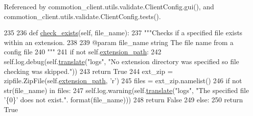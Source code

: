 Referenced by commotion\-\_\-client.\-utils.\-validate.\-Client\-Config.\-gui(), and commotion\-\_\-client.\-utils.\-validate.\-Client\-Config.\-tests().


\begin{DoxyCode}
235 
236     \textcolor{keyword}{def }\hyperlink{classcommotion__client_1_1utils_1_1validate_1_1ClientConfig_a8dbef5da5fb270a8842b3eed36bc595e}{check\_exists}(self, file\_name):
237         \textcolor{stringliteral}{"""Checks if a specified file exists within an extension.}
238 \textcolor{stringliteral}{}
239 \textcolor{stringliteral}{        @param file\_name string The file name from a config file}
240 \textcolor{stringliteral}{        """}
241         \textcolor{keywordflow}{if} \textcolor{keywordflow}{not} self.\hyperlink{classcommotion__client_1_1utils_1_1validate_1_1ClientConfig_a422e4fea49a7e582749c0e0c6d11e2d9}{extension\_path}:
242             self.log.debug(self.\hyperlink{classcommotion__client_1_1utils_1_1validate_1_1ClientConfig_a12d19377a853ce92cc0e0d758acdd804}{translate}(\textcolor{stringliteral}{"logs"}, \textcolor{stringliteral}{"No extension directory was specified so file
       checking was skipped."}))
243             \textcolor{keywordflow}{return} \textcolor{keyword}{True}
244         ext\_zip = zipfile.ZipFile(self.\hyperlink{classcommotion__client_1_1utils_1_1validate_1_1ClientConfig_a422e4fea49a7e582749c0e0c6d11e2d9}{extension\_path}, \textcolor{stringliteral}{'}\textcolor{stringliteral}{r')}
245 \textcolor{stringliteral}{        files = ext\_zip.namelist()}
246 \textcolor{stringliteral}{        }\textcolor{keywordflow}{if} \textcolor{keywordflow}{not} str(file\_name) \textcolor{keywordflow}{in} files:
247             self.log.warning(self.\hyperlink{classcommotion__client_1_1utils_1_1validate_1_1ClientConfig_a12d19377a853ce92cc0e0d758acdd804}{translate}(\textcolor{stringliteral}{"logs"}, \textcolor{stringliteral}{"The specified file '\{0\}' does not exist."}.
      format(file\_name)))
248             \textcolor{keywordflow}{return} \textcolor{keyword}{False}
249         \textcolor{keywordflow}{else}:
250             \textcolor{keywordflow}{return} \textcolor{keyword}{True}
            
\end{DoxyCode}
